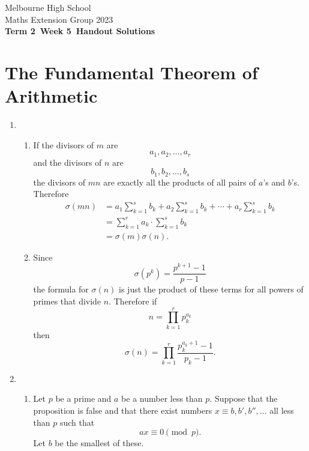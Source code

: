 \documentclass[a4paper]{article}
\title{{\thepdftitle}}
\author{Nathan Wong\and Tom Yan}
\date{2023}
\newcommand{\theterm}{2}
\newcommand{\theweek}{5}
\newcommand{\thedisplaytitle}{Term \theterm\ Week \theweek\ Handout Solutions}
\begin{document}
\noindent Melbourne High School\\
\noindent Maths Extension Group 2023\\
\noindent \textbf{\thedisplaytitle}\\
\section*{The Fundamental Theorem of Arithmetic}
\begin{enumerate}
  \item
  \begin{enumerate}
    \item If the divisors of \(m\) are \[a_1,a_2,\ldots,a_r\] and
  the divisors of \(n\) are \[b_1,b_2,\ldots,b_s\] the divisors
  of \(mn\) are exactly all the products of all pairs of \(a\)'s
  and \(b\)'s. Therefore
  \begin{displaymath}
    \begin{split}
    \sigma(mn)&=a_1\sum_{k=1}^{s}b_k+a_2\sum_{k=1}^{s}b_k+\cdots+a_r\sum_{k=1}^{s}b_k\\ &=\sum_{k=1}^{r}a_k\cdot\sum_{k=1}^{s}b_k\\&=\sigma(m)\sigma(n).
    \end{split}
  \end{displaymath}
\item Since \[\sigma(p^k)=\frac{p^{k+1}-1}{p-1}\] the formula
  for \(\sigma(n)\) is just the product of these terms for all
  powers of primes that divide \(n\). Therefore if
  \[n=\prod_{k=1}^rp_k^{a_k}\] then \[\sigma(n)=\prod_{k=1}^{r}\frac{p_k^{a_k+1}-1}{p_k-1}.\]
\end{enumerate}
\item
  \begin{enumerate}
  \item Let \(p\) be a prime and \(a\) be a number
    less than \(p\). Suppose that the proposition is false and
    that there exist numbers \(x\equiv b,b',b'',\ldots\) all
    less than \(p\)
    such that \[ax\equiv0\pmod{p}.\]
    Let \(b\) be the smallest of these.


\end{enumerate}
\end{enumerate}
\end{document}
